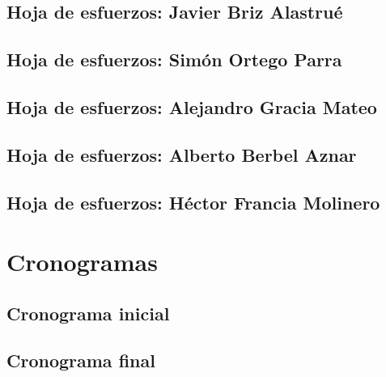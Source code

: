 \documentclass[10pt,spanish]{article}
\begin{document}
\subsection{Hoja de esfuerzos: Javier Briz Alastrué}

\blindtext
\subsection{Hoja de esfuerzos: Simón Ortego Parra}

\blindtext
\subsection{Hoja de esfuerzos: Alejandro Gracia Mateo}

\blindtext
\subsection{Hoja de esfuerzos: Alberto Berbel Aznar}

\blindtext
\subsection{Hoja de esfuerzos: Héctor Francia Molinero}

\blindtext

\section{Cronogramas}

\blindtext
\subsection{Cronograma inicial}

\blindtext
\subsection{Cronograma final}

\blindtext
\end{document}
